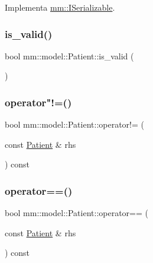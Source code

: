 Implementa \mbox{\hyperlink{classmm_1_1_i_serializable_a9717e6da47fcbac3ffa2e68152464e0a}{mm\+::\+I\+Serializable}}.

\mbox{\label{classmm_1_1model_1_1_patient_a5f9da3f880ef1adc4bc5443ea407f48f}} 
\subsubsection{\texorpdfstring{is\+\_\+valid()}{is\_valid()}}
{\footnotesize\ttfamily bool mm\+::model\+::\+Patient\+::is\+\_\+valid (\begin{DoxyParamCaption}{ }\end{DoxyParamCaption})}

\mbox{\label{classmm_1_1model_1_1_patient_a96fe68d415c82b084ca75e87aefe8314}} 
\subsubsection{\texorpdfstring{operator"!=()}{operator!=()}}
{\footnotesize\ttfamily bool mm\+::model\+::\+Patient\+::operator!= (\begin{DoxyParamCaption}\item[{const \mbox{\hyperlink{classmm_1_1model_1_1_patient}{Patient}} \&}]{rhs }\end{DoxyParamCaption}) const}

\mbox{\label{classmm_1_1model_1_1_patient_a69367747ebc66b1b4e2fdf961811d83d}} 
\subsubsection{\texorpdfstring{operator==()}{operator==()}}
{\footnotesize\ttfamily bool mm\+::model\+::\+Patient\+::operator== (\begin{DoxyParamCaption}\item[{const \mbox{\hyperlink{classmm_1_1model_1_1_patient}{Patient}} \&}]{rhs }\end{DoxyParamCaption}) const}

